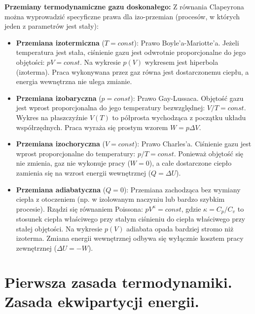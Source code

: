 \documentclass[11pt, a4paper]{article}
\begin{document}
\textbf{Przemiany termodynamiczne gazu doskonałego:}
Z równania Clapeyrona można wyprowadzić specyficzne prawa dla izo-przemian (procesów, w których jeden z parametrów jest stały):
\begin{itemize}
    \item \textbf{Przemiana izotermiczna} ($T = const$): Prawo Boyle'a-Mariotte'a. Jeżeli temperatura jest stała, ciśnienie gazu jest odwrotnie proporcjonalne do jego objętości: $pV = const$. Na wykresie $p(V)$ wykresem jest hiperbola (izoterma). Praca wykonywana przez gaz równa jest dostarczonemu ciepłu, a energia wewnętrzna nie ulega zmianie.
    \item \textbf{Przemiana izobaryczna} ($p = const$): Prawo Gay-Lussaca. Objętość gazu jest wprost proporcjonalna do jego temperatury bezwzględnej: $V/T = const$. Wykres na płaszczyźnie $V(T)$ to półprosta wychodząca z początku układu współrzędnych. Praca wyraża się prostym wzorem $W = p\Delta V$.
    \item \textbf{Przemiana izochoryczna} ($V = const$): Prawo Charles'a. Ciśnienie gazu jest wprost proporcjonalne do temperatury: $p/T = const$. Ponieważ objętość się nie zmienia, gaz nie wykonuje pracy ($W = 0$), a całe dostarczone ciepło zamienia się na wzrost energii wewnętrznej ($Q = \Delta U$).
    \item \textbf{Przemiana adiabatyczna} ($Q = 0$): Przemiana zachodząca bez wymiany ciepła z otoczeniem (np. w izolowanym naczyniu lub bardzo szybkim procesie). Rządzi się równaniem Poissona: $pV^\kappa = const$, gdzie $\kappa = C_p/C_v$ to stosunek ciepła właściwego przy stałym ciśnieniu do ciepła właściwego przy stałej objętości. Na wykresie $p(V)$ adiabata opada bardziej stromo niż izoterma. Zmiana energii wewnętrznej odbywa się wyłącznie kosztem pracy zewnętrznej ($\Delta U = -W$).
\end{itemize}

\section{Pierwsza zasada termodynamiki. Zasada ekwipartycji energii.}
\end{document}
